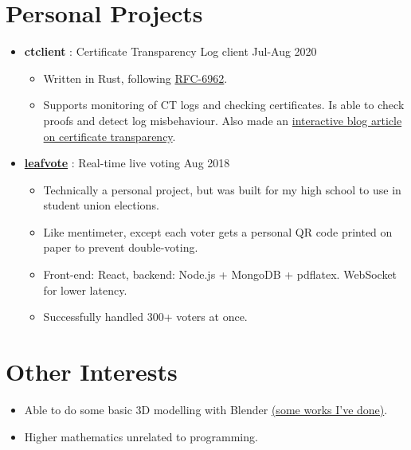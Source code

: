   \section{Personal Projects}

  \begin{itemize}

    \item \textbf{ctclient} : Certificate Transparency Log client \dashdiv{} Jul-Aug 2020

    \begin{itemize}
      \item Written in Rust, following \href{https://tools.ietf.org/html/rfc6962}{\color{link}RFC-6962}.
      \item Supports monitoring of CT logs and checking certificates. Is able to check proofs and detect log misbehaviour. Also made an \href{https://blog.maowtm.org/ct/en.html}{\color{link}interactive blog article on certificate transparency}.
    \end{itemize}

    \item \href{https://leafvote.mww.moe}{\color{link}\textbf{leafvote}} : Real-time live voting \dashdiv{} Aug 2018

    \begin{itemize}
      \item Technically a personal project, but was built for my high school to use in student union elections.
      \item Like mentimeter, except each voter gets a personal QR code printed on paper to prevent double-voting.
      \item Front-end: React, backend: Node.js + MongoDB + pdflatex. WebSocket for lower latency.
      \item Successfully handled 300+ voters at once.
    \end{itemize}

  \end{itemize}

  \section{Other Interests}

  \begin{itemize}[itemsep=0.1\parskip]
    \item Able to do some basic 3D modelling with Blender \href{https://maowtm.org/Artworks/}{\color{link}(some works I've done)}.

    \item Higher mathematics unrelated to programming.
  \end{itemize}


